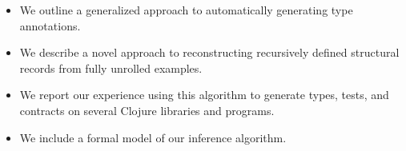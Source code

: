 

\begin{itemize}
\item We outline a generalized approach to automatically
    generating type annotations.
\item
  We describe a novel approach to reconstructing recursively
  defined structural records from fully unrolled examples.
\item
  We report our experience using this algorithm to generate
  types, tests, and contracts on several
  Clojure libraries and programs.
\item
  We include a formal model of our inference algorithm.
\end{itemize}

